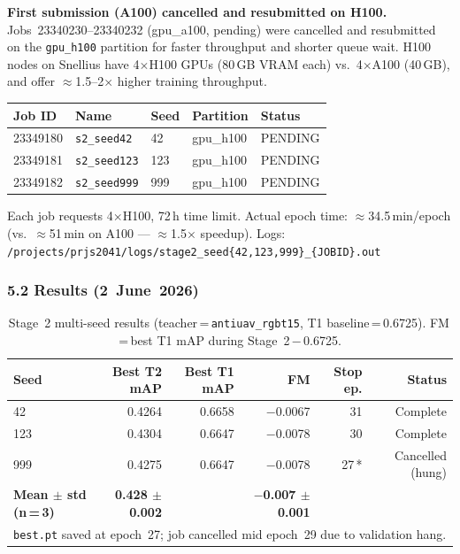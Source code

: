 \noindent \textbf{First submission (A100) cancelled and resubmitted on H100.}
Jobs~23340230--23340232 (gpu\_a100, pending) were cancelled and
resubmitted on the \texttt{gpu\_h100} partition for faster throughput
and shorter queue wait. H100 nodes on Snellius have 4$\times$H100
GPUs (80\,GB VRAM each) vs.\ 4$\times$A100 (40\,GB), and offer
$\approx$1.5--2$\times$ higher training throughput.

\begin{center}\small
\begin{tabular}{lllll}
\hline
\textbf{Job ID} & \textbf{Name} & \textbf{Seed} & \textbf{Partition} & \textbf{Status} \\
\hline
23349180 & \texttt{s2\_seed42}  & 42  & gpu\_h100 & PENDING \\
23349181 & \texttt{s2\_seed123} & 123 & gpu\_h100 & PENDING \\
23349182 & \texttt{s2\_seed999} & 999 & gpu\_h100 & PENDING \\
\hline
\end{tabular}
\end{center}

\noindent Each job requests 4$\times$H100, 72\,h time limit.
Actual epoch time: $\approx$34.5\,min/epoch
(vs.\ $\approx$51\,min on A100 — $\approx$1.5$\times$ speedup).
Logs:
\texttt{/projects/prjs2041/logs/stage2\_seed\{42,123,999\}\_\{JOBID\}.out}

\subsubsection*{5.2 Results (2~June~2026)}

\begin{table}[h]
\centering
\caption{Stage~2 multi-seed results (teacher\,=\,\texttt{antiuav\_rgbt15},
T1 baseline\,=\,0.6725). FM\,=\,best T1 mAP during Stage~2\,$-$\,0.6725.}
\label{tab:stage2_multiseed}
\small
\begin{tabular}{lrrrrr}
\hline
\textbf{Seed} & \textbf{Best T2 mAP} & \textbf{Best T1 mAP} & \textbf{FM} &
\textbf{Stop ep.} & \textbf{Status} \\
\hline
42  & 0.4264 & 0.6658 & $-$0.0067 & 31 & Complete \\
123 & 0.4304 & 0.6647 & $-$0.0078 & 30 & Complete \\
999 & 0.4275 & 0.6647 & $-$0.0078 & 27\,* & Cancelled (hung) \\
\hline
\textbf{Mean $\pm$ std (n\,=\,3)} & \textbf{0.428 $\pm$ 0.002} & & \textbf{$-$0.007 $\pm$ 0.001} & & \\
\hline
\multicolumn{6}{l}{\small * \texttt{best.pt} saved at epoch~27; job cancelled mid epoch~29 due to validation hang.}
\end{tabular}
\end{table}

